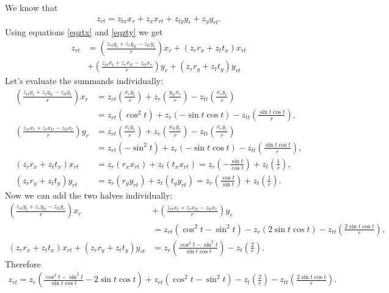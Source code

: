 \documentclass{article}
\begin{document}
We know that
\begin{align*}
  z_{rt} = z_{tx}x_r + z_x x_{rt} + z_{ty} y_r + z_y y_{rt}.
\end{align*}
Using equations \ref{eqztx} and \ref{eqzty} we get
\begin{align*}
  z_{rt} &= \left(\frac{z_{rt} y_t + z_r y_{tt} - z_{tt}y_r}{r}\right)x_r
  + \left(z_r r_x + z_t t_x\right)x_{rt}\\
  &+ \left(\frac{z_{rt}x_t + z_r x_{tt} - z_{tt}x_r}{r}\right)y_r
  + \left(z_r r_y + z_t t_y\right)y_{rt}
\end{align*}
Let's evaluate the summands individually:
\begin{align*}
  \left(\frac{z_{rt} y_t + z_r y_{tt} - z_{tt}y_r}{r}\right)x_r
  &= z_{rt}\left(\frac{x_r y_t}{r}\right) + z_r \left(\frac{y_{tt}x_r}{r}\right)-z_{tt}\left(\frac{x_r y_r}{r}\right)\\
  &= z_{rt}\left(\cos^2 t\right) + z_r \left(-\sin t\cos t\right)-z_{tt}\left(\frac{\sin t\cos t}{r}\right),\\
  \left(\frac{z_{rt}x_t + z_r x_{tt} - z_{tt}x_r}{r}\right)y_r
  &= z_{rt}\left(\frac{x_t y_r}{r}\right)+z_r\left(\frac{x_{tt} y_r}{r}\right)-z_{tt}\left(\frac{x_r y_r}{r}\right)\\
  &= z_{rt}\left(-\sin^2 t\right) + z_r \left(-\sin t\cos t\right) - z_{tt}\left(\frac{\sin t\cos t}{r}\right),\\
  \left(z_r r_x + z_t t_x\right)x_{rt}
  &=z_r (r_x x_{rt}) + z_t (t_x x_{rt})
  =z_r \left(-\frac{\sin t}{\cos t}\right) + z_t \left(\frac{1}{r}\right),\\
  \left(z_r r_y + z_t t_y\right)y_{rt}
  &=z_r \left(r_y y_{rt}\right) + z_t \left(t_y y_{rt}\right)
  =z_r \left(\frac{\cos t}{\sin t}\right) + z_t \left(\frac{1}{r}\right).
\end{align*}
Now we can add the two halves individually:
\begin{align*}
  \left(\frac{z_{rt} y_t + z_r y_{tt} - z_{tt}y_r}{r}\right)x_r
  &+\left(\frac{z_{rt}x_t + z_r x_{tt} - z_{tt}x_r}{r}\right)y_r\\
  &=z_{rt}\left(\cos^2 t - \sin^2 t\right) - z_r(2\sin t\cos t)-z_{tt}\left(\frac{2\sin t\cos t}{r}\right),\\
  \left(z_r r_x + z_t t_x\right)x_{rt}
  +\left(z_r r_y + z_t t_y\right)y_{rt} 
  &=z_r\left(\frac{\cos^2 t - \sin^2 t}{\sin t \cos t}\right) - z_t\left(\frac{2}{r}\right).
\end{align*}
Therefore
\begin{align*}
  z_{rt} = z_r\left(\frac{\cos^2 t - \sin^2 t}{\sin t \cos t}-2\sin t\cos t\right)+ z_{rt}\left(\cos^2 t - \sin^2 t\right)-z_t\left(\frac{2}{r}\right)
  -z_{tt}\left(\frac{2\sin t\cos t}{r}\right).
\end{align*}
\end{document}
